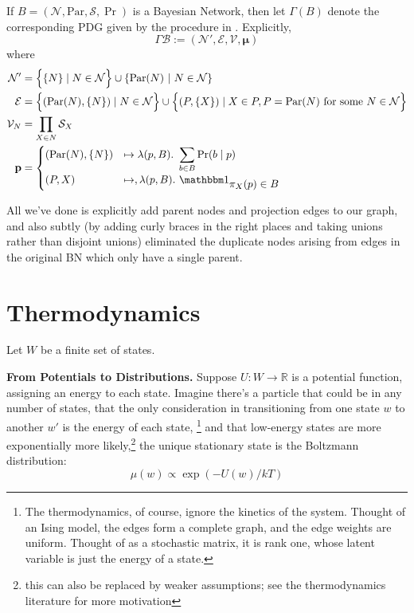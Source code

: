 \documentclass{article}
\theoremstyle{plain}
\theoremstyle{definition}
\theoremstyle{remark}
\newcommand{\bmu}{\boldsymbol{\mu}}
\newcommand{\Ed}{\mathcal E}
\newcommand\PDGof{\Gamma}
\numberwithin{equation}{section}
\begin{document}
	
	\begin{defn} \label{def:bnconvert-formal}
		If $B = (\mathcal N, \mathrm{Par}, \mathcal S, \Pr)$ is a Bayesian Network, then let $\PDGof (B)$ denote the corresponding PDG given by the procedure in . Explicitly, 
		\[ \PDGof\mathcal B :=  (\mathcal N', \Ed, \mathcal V, \bmu) \]
		where %
		\begin{align*}
		\mathcal N' &=  \left\{ \Big.\{N\} \mid N \in \mathcal N\right\} \cup \left\{ \mathrm{Par}(N) ~\middle|~ N \in \cal N \right\} \\%
		\Ed &= \left\{ \vphantom{\Big|}(\mathrm{Par}(N), \{N\}) \mid N \in \mathcal N \right\} \cup 
		\left\{\vphantom{\Big|} (P, \{X\}) \mid X \in P, P = \mathrm{Par}(N) \text{ for some }N \in \mathcal N \right\} \\
		\mathcal V_N &= \prod_{X \in N} \mathcal S_X \\
		\mathbf p &= \begin{cases}
		(\mathrm{Par}(N), \{N\}) &\mapsto \lambda(p, B).~ \displaystyle\sum_{b \in  B} \Pr(b \mid p) \\
		(P, X) &\mapsto, \lambda (p, B).~ \displaystyle \mathbbm 1_{\displaystyle\pi_X(p) \in B}
		\end{cases}
		\end{align*}
	\end{defn}
	All we've done is explicitly add parent nodes and projection edges to our graph, and also subtly (by adding curly braces in the right places and taking unions rather than disjoint unions) eliminated the duplicate nodes arising from edges in the original BN which only have a single parent.
	
	\section{Thermodynamics}\label{sec:thermo-background}
	Let $W$ be a finite set of states.
	
	\textbf{From Potentials to Distributions.}
	Suppose $U: W \to \mathbb R$ is a potential function, assigning an energy to each state. Imagine there's a particle that could be in any number of states, that the only consideration in transitioning from one state $w$ to another $w'$ is the energy of each state,%
		\footnote{The thermodynamics, of course, ignore the kinetics of the system. Thought of an Ising model, the edges form a complete graph, and the edge weights are uniform. Thought of as a stochastic matrix, it is rank one, whose latent variable is just the energy of a state.}
	and that low-energy states are more exponentially more likely,\footnote{this can also be replaced by weaker assumptions; see the thermodynamics literature for more motivation}
	the unique stationary state is the Boltzmann distribution:
	\begin{equation}
		 \mu(w) \propto \exp( - U(w) / kT ) \label{eq:boltzmann-appendix}
	\end{equation}
\end{document}
